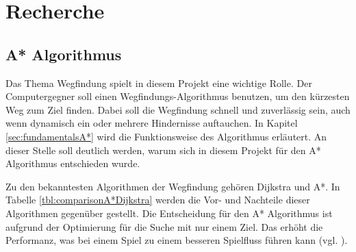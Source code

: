 \chapter{Recherche}
\label{sec:recherche}


\section{A* Algorithmus}
Das Thema Wegfindung spielt in diesem Projekt eine wichtige Rolle. Der Computergegner soll einen Wegfindungs-Algorithmus benutzen, um den kürzesten Weg zum Ziel finden. Dabei soll die Wegfindung schnell und zuverlässig sein, auch wenn dynamisch ein oder mehrere Hindernisse auftauchen. In Kapitel \ref{sec:fundamentalsA*} wird die Funktionsweise des Algorithmus erläutert. An dieser Stelle soll deutlich werden, warum sich in diesem Projekt für den A* Algorithmus entschieden wurde.

Zu den bekanntesten Algorithmen der Wegfindung gehören Dijkstra und A*. In Tabelle \ref{tbl:comparisonA*Dijkstra} werden die Vor- und Nachteile dieser Algorithmen gegenüber gestellt. Die Entscheidung für den A* Algorithmus ist aufgrund der Optimierung für die Suche mit nur einem Ziel. Das erhöht die Performanz, was bei einem Spiel zu einem besseren Spielfluss führen kann (vgl. \cite{astar_performance}).


